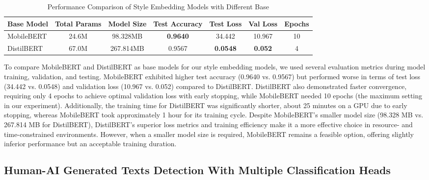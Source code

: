 \documentclass{article}
\begin{document}
\begin{table}[H]
\centering
\caption{Performance Comparison of Style Embedding Models with Different Base}
\label{tab:model_performance}
\begin{tabular}{lcccccc}
\toprule
Base Model    & Total Params & Model Size & Test Accuracy & Test Loss & Val Loss & Epochs \\ 
\midrule
MobileBERT    & 24.6M            & 98.328MB         & \textbf{0.9640}       & 34.442    & 10.967   & 10     \\
DistilBERT    & 67.0M            & 267.814MB      & 0.9567       & \textbf{0.0548}    & \textbf{0.052}    & 4      \\
\bottomrule
\end{tabular}
\end{table}

To compare MobileBERT and DistilBERT as base models for our style embedding models, we used several evaluation metrics during model training, validation, and testing. MobileBERT exhibited higher test accuracy (0.9640 vs. 0.9567) but performed worse in terms of test loss (34.442 vs. 0.0548) and validation loss (10.967 vs. 0.052) compared to DistilBERT. DistilBERT also demonstrated faster convergence, requiring only 4 epochs to achieve optimal validation loss with early stopping, while MobileBERT needed 10 epochs (the maximum setting in our experiment). Additionally, the training time for DistilBERT was significantly shorter, about 25 minutes on a GPU due to early stopping, whereas MobileBERT took approximately 1 hour for its training cycle. Despite MobileBERT's smaller model size (98.328 MB vs. 267.814 MB for DistilBERT), DistilBERT's superior loss metrics and training efficiency make it a more effective choice in resource- and time-constrained environments. However, when a smaller model size is required, MobileBERT remains a feasible option, offering slightly inferior performance but an acceptable training duration.


\subsection{Human-AI Generated Texts Detection With Multiple Classification Heads}
\end{document}
